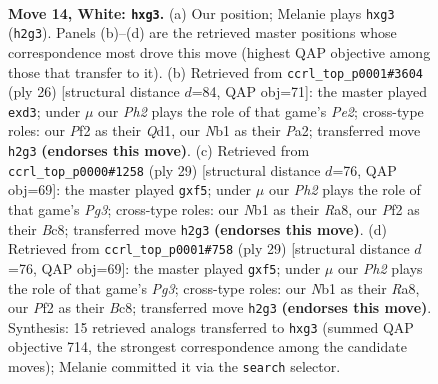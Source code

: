 \documentclass[11pt]{article}
\begin{document}
\clearpage

\begin{figure}[p]\centering
\begin{subfigure}{0.46\textwidth}\centering
\resizebox{\linewidth}{!}{%
\newchessgame
\chessboard[
  setfen={rnbqk2r/8/2pb1np1/pp1p1p2/3P4/6p1/PP2PPBP/RNBQNRK1 w kq - 0 14},
  showmover=false,
  pgfstyle=straightmove, color=movearrow, markmove={h2-g3}
]}
\caption{}
\end{subfigure}\hfill
\begin{subfigure}{0.46\textwidth}\centering
\resizebox{\linewidth}{!}{%
\newchessgame
\chessboard[
  setfen={r1bqk2r/5ppp/2pb1n2/p2p4/N7/3p2P1/PP2PPBP/R1BQ1RK1 w kq - 0 14},
  showmover=false,
  pgfstyle=straightmove, color=movearrow, markmove={e2-d3}
]}
\caption{}
\end{subfigure}
\\[4pt]
\begin{subfigure}{0.46\textwidth}\centering
\resizebox{\linewidth}{!}{%
\newchessgame
\chessboard[
  setfen={r1bqnrk1/pp4b1/3p2p1/3PpP1p/7P/2NBBP2/PP1Q2P1/R3K2R b KQ - 0 15},
  showmover=false,
  pgfstyle=straightmove, color=movearrow, markmove={g6-f5}
]}
\caption{}
\end{subfigure}\hfill
\begin{subfigure}{0.46\textwidth}\centering
\resizebox{\linewidth}{!}{%
\newchessgame
\chessboard[
  setfen={r1bqnrk1/pp4b1/3p2p1/3PpP1p/7P/2NBBP2/PP1Q2P1/R3K2R b KQ - 0 15},
  showmover=false,
  pgfstyle=straightmove, color=movearrow, markmove={g6-f5}
]}
\caption{}
\end{subfigure}
\caption{\textbf{Move 14, White: \texttt{hxg3}.} (a) Our position; Melanie plays \texttt{hxg3} (\texttt{h2g3}). Panels (b)--(d) are the retrieved master positions whose correspondence most drove this move (highest QAP objective among those that transfer to it). (b) Retrieved from \texttt{ccrl\_top\_p0001\#3604} (ply 26) [structural distance $d$=84, QAP obj=71]: the master played \texttt{exd3}; under $\mu$ our \emph{Ph2} plays the role of that game's \emph{Pe2}; cross-type roles: our \emph{P}f2 as their \emph{Q}d1, our \emph{N}b1 as their \emph{P}a2; transferred move \texttt{h2g3} \textbf{(endorses this move)}. (c) Retrieved from \texttt{ccrl\_top\_p0000\#1258} (ply 29) [structural distance $d$=76, QAP obj=69]: the master played \texttt{gxf5}; under $\mu$ our \emph{Ph2} plays the role of that game's \emph{Pg3}; cross-type roles: our \emph{N}b1 as their \emph{R}a8, our \emph{P}f2 as their \emph{B}c8; transferred move \texttt{h2g3} \textbf{(endorses this move)}. (d) Retrieved from \texttt{ccrl\_top\_p0001\#758} (ply 29) [structural distance $d$=76, QAP obj=69]: the master played \texttt{gxf5}; under $\mu$ our \emph{Ph2} plays the role of that game's \emph{Pg3}; cross-type roles: our \emph{N}b1 as their \emph{R}a8, our \emph{P}f2 as their \emph{B}c8; transferred move \texttt{h2g3} \textbf{(endorses this move)}. Synthesis: 15 retrieved analogs transferred to \texttt{hxg3} (summed QAP objective 714, the strongest correspondence among the candidate moves); Melanie committed it via the \texttt{search} selector.}
\label{fig:thought-m26}
\end{figure}
\end{document}
